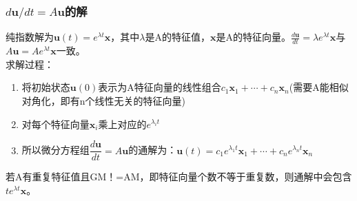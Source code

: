 \documentclass[UTF8]{article}
\begin{document}
    \subsubsection{$d \boldsymbol{u} / d t=A \boldsymbol{u}$的解}
    纯指数解为$\boldsymbol{u}(t)=e^{\lambda t} \boldsymbol{x}$，其中$\lambda$是A的特征值，$\bm{x}$是A的特征向量。$\frac{d \boldsymbol{u}}{d t}=\lambda e^{\lambda t} \boldsymbol{x}$与$A \boldsymbol{u}=A e^{\lambda t} \boldsymbol{x}$一致。
    \\
    求解过程：
    \begin{enumerate}
        \item 将初始状态$\boldsymbol{u}(0)$表示为A特征向量的线性组合$c_{1} \boldsymbol{x}_{1}+\cdots+c_{n} \boldsymbol{x}_{n}$(需要A能相似对角化，即有n个线性无关的特征向量)
        \item 对每个特征向量$\boldsymbol{x}_{i}$乘上对应的$e^{\lambda_{i} t}$
        \item 所以微分方程组$\dfrac{d \bm{u}}{d t}=A \bm{u}$的通解为：$\bm{u}(t)=c_{1} e^{\lambda_{1} t} \bm{x}_{1}+\cdots+c_{n} e^{\lambda_{n} t} \bm{x}_{n}$
    \end{enumerate}
    若A有重复特征值且GM！=AM，即特征向量个数不等于重复数，则通解中会包含$t e^{\lambda t} \boldsymbol{x}$。
\end{document}
